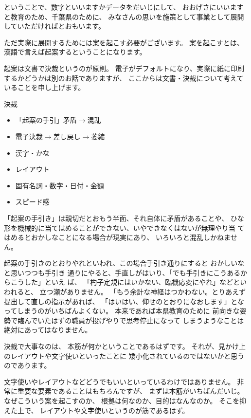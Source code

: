 \documentclass[uplatex,jis2004,dvipdfmx,12pt]{jsarticle}
\begin{document}
ということで、数字といいますかデータをだいじにして、
おおげさにいいますと教育のため、千葉県のために、
みなさんの思いを施策として事業として展開していただければとおもいます。

ただ実際に展開するためには案を起こす必要がございます。
案を起こすとは、漢語で言えば起案するということになります。

起案は文書で決裁というのが原則。
電子がデフォルトになり、実際に紙に印刷するかどうかは別のお話でありますが、
ここからは文書・決裁について考えていることを申し上げます。

決裁
       \begin{itemize}
	\item 「起案の手引」矛盾$\longrightarrow${}混乱
	\item 電子決裁$\longrightarrow${}差し戻し$\longrightarrow${}萎縮
	\item 漢字・かな
	\item レイアウト
	\item 固有名詞・数字・日付・金額
	\item スピード感
   \end{itemize}



「起案の手引き」は親切だとおもう半面、それ自体に矛盾があることや、
ひな形を機械的に当てはめることができない、いやできなくはないが無理やり当
てはめるとおかしなことになる場合が現実にあり、
いろいろと混乱しかねません。

起案の手引きのとおりやれといわれ、この場合手引き通りにすると
おかしいなと思いつつも手引き
通りにやると、手直しがはいり、「でも手引きにこうあるからこうした」といえ
ば、
「杓子定規にはいかない、臨機応変にやれ」などといわれると、
立つ瀬がありません。
「もう余計な神経はつかわない。とりあえず提出して直しの指示があれば、
「はいはい、仰せのとおりになおします」となってしまうのがいちばんよくない。
本来であれば本県教育のために
前向きな姿勢で臨んでいたはずの職員が投げやりで思考停止になって
しまうようなことは絶対にあってはなりません。

決裁で大事なのは、
本筋が何かということであるはずです。
それが、見かけ上のレイアウトや文字使いといったことに
矮小化されているのではないかと思うのであります。

文字使いやレイアウトなどどうでもいいといっているわけではありません。
非常に重要な要素であることはもちろんですが、
まずは本筋がいちばんだいじ。
なぜこういう案を起こすのか、
根拠は何なのか、目的はなんなのか。
そこを抑えた上で、
レイアウトや文字使いというのが筋であるはず。
\end{document}
